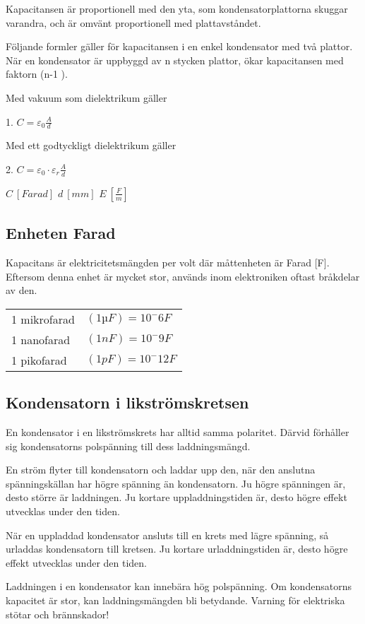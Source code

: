 Kapacitansen är proportionell med den yta, som kondensatorplattorna skuggar varandra,
och är omvänt proportionell med plattavståndet.

Följande formler gäller för kapacitansen i en enkel kondensator med två plattor. När
en kondensator är uppbyggd av n stycken plattor, ökar kapacitansen med faktorn (n-1 ).

Med vakuum som dielektrikum gäller

1. \(C = \varepsilon _0 \frac{A}{d}\)

Med ett godtyckligt dielektrikum gäller

2. \(C = \varepsilon _0 \cdot \varepsilon _r \frac{A}{d}\)

\(C\ [Farad]\) \(d\ [mm]\) \(E\ [\frac{F}{m}]\)

\subsection{Enheten Farad}
Kapacitans är elektricitetsmängden per volt
där måttenheten är Farad [F]. Eftersom denna
enhet är mycket stor, används inom elektroniken oftast bråkdelar av den.

\begin{tabular}{ll}
1 mikrofarad & \((1 µF) = 10^-6 F\) \\
1 nanofarad & \((1 nF) = 10^-9 F\) \\
1 pikofarad & \((1 pF) = 10^-12 F\) \\
\end{tabular}

\subsection{Kondensatorn i likströmskretsen}

En kondensator i en likströmskrets har alltid samma polaritet. Därvid förhåller
sig kondensatorns polspänning till dess laddningsmängd.

En ström flyter till kondensatorn och laddar upp den, när den anslutna
spänningskällan har högre spänning än kondensatorn. Ju högre spänningen är,
desto större är laddningen. Ju kortare uppladdningstiden är, desto högre effekt
utvecklas under den tiden.

När en uppladdad kondensator ansluts till en krets med lägre spänning, så
urladdas kondensatorn till kretsen. Ju kortare urladdningstiden är, desto högre
effekt utvecklas under den tiden.

Laddningen i en kondensator kan innebära hög polspänning. Om kondensatorns
kapacitet är stor, kan laddningsmängden bli betydande. Varning för elektriska
stötar och brännskador!

